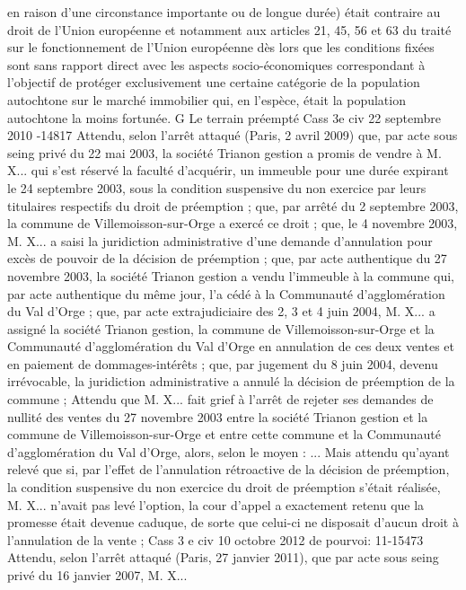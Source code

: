 \documentclass[11pt,a4paper]{report}
\begin{document}
	en raison d'une circonstance importante ou de longue durée) était contraire au droit de l'Union européenne et
	notamment aux articles 21, 45, 56 et 63 du traité sur le fonctionnement de l'Union européenne dès lors que les
	conditions fixées sont sans rapport direct avec les aspects socio-économiques correspondant à l'objectif de
	protéger exclusivement une certaine catégorie de la population autochtone sur le marché immobilier qui, en
	l'espèce, était la population autochtone la moins fortunée.
	G Le terrain préempté
	Cass 3e civ 22 septembre 2010 -14817
	Attendu, selon l'arrêt attaqué (Paris, 2 avril 2009) que, par acte sous seing privé du 22 mai 2003, la société
	Trianon gestion a promis de vendre à M. X... qui s'est réservé la faculté d'acquérir, un immeuble pour une durée
	expirant le 24 septembre 2003, sous la condition suspensive du non exercice par leurs titulaires respectifs du
	droit de préemption ; que, par arrêté du 2 septembre 2003, la commune de Villemoisson-sur-Orge a exercé ce
	droit ; que, le 4 novembre 2003, M. X... a saisi la juridiction administrative d'une demande d'annulation pour
	excès de pouvoir de la décision de préemption ; que, par acte authentique du 27 novembre 2003, la société
	Trianon gestion a vendu l'immeuble à la commune qui, par acte authentique du même jour, l'a cédé à la
	Communauté d'agglomération du Val d'Orge ; que, par acte extrajudiciaire des 2, 3 et 4 juin 2004, M. X... a
	assigné la société Trianon gestion, la commune de Villemoisson-sur-Orge et la Communauté d'agglomération du
	Val d'Orge en annulation de ces deux ventes et en paiement de dommages-intérêts ; que, par jugement du 8 juin
	2004, devenu irrévocable, la juridiction administrative a annulé la décision de préemption de la commune ;
	Attendu que M. X... fait grief à l'arrêt de rejeter ses demandes de nullité des ventes du 27 novembre 2003 entre
	la société Trianon gestion et la commune de Villemoisson-sur-Orge et entre cette commune et la Communauté
	d'agglomération du Val d'Orge, alors, selon le moyen :
	...
	Mais attendu qu'ayant relevé que si, par l'effet de l'annulation rétroactive de la décision de préemption, la
	condition suspensive du non exercice du droit de préemption s'était réalisée, M. X... n'avait pas levé l'option, la
	cour d'appel a exactement retenu que la promesse était devenue caduque, de sorte que celui-ci ne disposait
	d'aucun droit à l'annulation de la vente ;
	Cass 3 e civ 10 octobre 2012 \No  de pourvoi: 11-15473
	Attendu, selon l'arrêt attaqué (Paris, 27 janvier 2011), que par acte sous seing privé du 16 janvier 2007, M. X...
\end{document}
